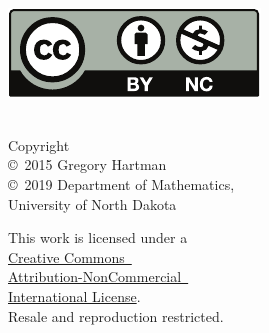 \noindent\hspace{-1in}
\begin{minipage}[t]{.4\linewidth}\mbox{}\\
\href{http://creativecommons.org/licenses/by-nc/4.0/}{\includegraphics{figures/raw/by-nc}}
\end{minipage}\quad
\begin{minipage}[t]{.5\linewidth}\raggedright\mbox{}\\
\noindent Copyright\\
\copyright~2015 Gregory Hartman\\
\copyright~2019 Department of Mathematics,\\
University of North Dakota\medskip

This work is licensed under a\iflatexml\ \else\\\fi \href{http://creativecommons.org/licenses/by-nc/4.0/}{Creative Commons\iflatexml\ \else\\\fi
Attribution-NonCommercial\iflatexml\ \else\\ International License}.\\
Resale and reproduction restricted.
\end{minipage}


